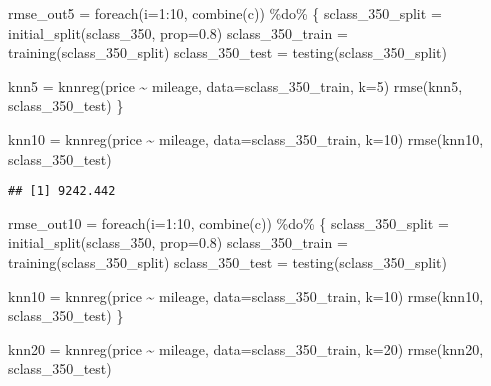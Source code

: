 \documentclass[
]{article}
\newenvironment{Shaded}{\begin{snugshade}}{\end{snugshade}}
\newcommand{\AttributeTok}[1]{\textcolor[rgb]{0.77,0.63,0.00}{#1}}
\newcommand{\DecValTok}[1]{\textcolor[rgb]{0.00,0.00,0.81}{#1}}
\newcommand{\FloatTok}[1]{\textcolor[rgb]{0.00,0.00,0.81}{#1}}
\newcommand{\FunctionTok}[1]{\textcolor[rgb]{0.00,0.00,0.00}{#1}}
\newcommand{\NormalTok}[1]{#1}
\newcommand{\OtherTok}[1]{\textcolor[rgb]{0.56,0.35,0.01}{#1}}
\newcommand{\SpecialCharTok}[1]{\textcolor[rgb]{0.00,0.00,0.00}{#1}}
\newcommand{\StringTok}[1]{\textcolor[rgb]{0.31,0.60,0.02}{#1}}
\begin{document}
\begin{Shaded}
\begin{Highlighting}[]
\NormalTok{rmse\_out5 }\OtherTok{=} \FunctionTok{foreach}\NormalTok{(}\AttributeTok{i=}\DecValTok{1}\SpecialCharTok{:}\DecValTok{10}\NormalTok{, }\FunctionTok{combine}\NormalTok{(}\StringTok{\textquotesingle{}c\textquotesingle{}}\NormalTok{)) }\SpecialCharTok{\%do\%}\NormalTok{ \{}
\NormalTok{  sclass\_350\_split }\OtherTok{=} \FunctionTok{initial\_split}\NormalTok{(sclass\_350, }\AttributeTok{prop=}\FloatTok{0.8}\NormalTok{)}
\NormalTok{  sclass\_350\_train }\OtherTok{=} \FunctionTok{training}\NormalTok{(sclass\_350\_split)}
\NormalTok{  sclass\_350\_test }\OtherTok{=} \FunctionTok{testing}\NormalTok{(sclass\_350\_split)}
  
\NormalTok{  knn5 }\OtherTok{=} \FunctionTok{knnreg}\NormalTok{(price }\SpecialCharTok{\textasciitilde{}}\NormalTok{ mileage, }\AttributeTok{data=}\NormalTok{sclass\_350\_train, }\AttributeTok{k=}\DecValTok{5}\NormalTok{)}
  \FunctionTok{rmse}\NormalTok{(knn5, sclass\_350\_test)}
\NormalTok{\}}

\NormalTok{knn10 }\OtherTok{=} \FunctionTok{knnreg}\NormalTok{(price }\SpecialCharTok{\textasciitilde{}}\NormalTok{ mileage, }\AttributeTok{data=}\NormalTok{sclass\_350\_train, }\AttributeTok{k=}\DecValTok{10}\NormalTok{)}
\FunctionTok{rmse}\NormalTok{(knn10, sclass\_350\_test)}
\end{Highlighting}
\end{Shaded}

\begin{verbatim}
## [1] 9242.442
\end{verbatim}

\begin{Shaded}
\begin{Highlighting}[]
\NormalTok{rmse\_out10 }\OtherTok{=} \FunctionTok{foreach}\NormalTok{(}\AttributeTok{i=}\DecValTok{1}\SpecialCharTok{:}\DecValTok{10}\NormalTok{, }\FunctionTok{combine}\NormalTok{(}\StringTok{\textquotesingle{}c\textquotesingle{}}\NormalTok{)) }\SpecialCharTok{\%do\%}\NormalTok{ \{}
\NormalTok{  sclass\_350\_split }\OtherTok{=} \FunctionTok{initial\_split}\NormalTok{(sclass\_350, }\AttributeTok{prop=}\FloatTok{0.8}\NormalTok{)}
\NormalTok{  sclass\_350\_train }\OtherTok{=} \FunctionTok{training}\NormalTok{(sclass\_350\_split)}
\NormalTok{  sclass\_350\_test }\OtherTok{=} \FunctionTok{testing}\NormalTok{(sclass\_350\_split)}
  
\NormalTok{  knn10 }\OtherTok{=} \FunctionTok{knnreg}\NormalTok{(price }\SpecialCharTok{\textasciitilde{}}\NormalTok{ mileage, }\AttributeTok{data=}\NormalTok{sclass\_350\_train, }\AttributeTok{k=}\DecValTok{10}\NormalTok{)}
  \FunctionTok{rmse}\NormalTok{(knn10, sclass\_350\_test)}
\NormalTok{\}}

\NormalTok{knn20 }\OtherTok{=} \FunctionTok{knnreg}\NormalTok{(price }\SpecialCharTok{\textasciitilde{}}\NormalTok{ mileage, }\AttributeTok{data=}\NormalTok{sclass\_350\_train, }\AttributeTok{k=}\DecValTok{20}\NormalTok{)}
\FunctionTok{rmse}\NormalTok{(knn20, sclass\_350\_test)}
\end{Highlighting}
\end{Shaded}
\end{document}
